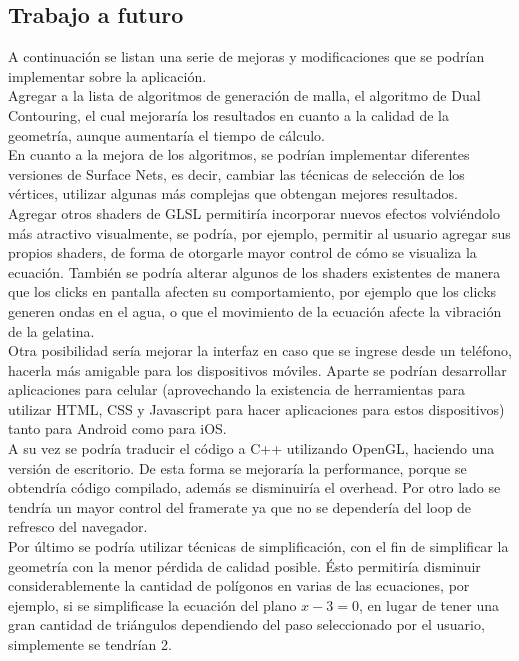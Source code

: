 \documentclass[12pt]{article}
\begin{document}
\subsection{Trabajo a futuro}
A continuación se listan una serie de mejoras y modificaciones que se podrían implementar sobre la aplicación.
\\Agregar a la lista de algoritmos de generación de malla, el algoritmo de Dual Contouring\cite{dualcontour}, el cual mejoraría los resultados en cuanto a la calidad de la geometría, aunque aumentaría el tiempo de cálculo. 
\\En cuanto a la mejora de los algoritmos, se podrían implementar diferentes versiones de Surface Nets, es decir, cambiar las técnicas de selección de los vértices, utilizar algunas más complejas que obtengan mejores resultados.
\\Agregar otros shaders de GLSL permitiría incorporar nuevos efectos volviéndolo más atractivo visualmente, se podría, por ejemplo, permitir al usuario agregar sus propios shaders, de forma de otorgarle  mayor control de cómo se visualiza la ecuación. También se podría alterar algunos de los shaders existentes de manera que los clicks en pantalla afecten su comportamiento, por ejemplo que los clicks generen ondas en el agua, o que el movimiento de la ecuación afecte la vibración de la gelatina.
\\Otra posibilidad sería mejorar la interfaz en caso que se ingrese desde un teléfono, hacerla más amigable para los dispositivos móviles.
Aparte se podrían desarrollar aplicaciones para celular (aprovechando la existencia de herramientas para utilizar HTML, CSS y Javascript para hacer aplicaciones para estos dispositivos) tanto para Android como para iOS. 
\\A su vez se podría traducir el código a C++ utilizando OpenGL, haciendo una versión de escritorio. De esta forma se mejoraría la performance, porque se obtendría código compilado, además se disminuiría el overhead. Por otro lado se tendría un mayor control del framerate ya que no se dependería del loop de refresco del navegador.
\\Por último se podría utilizar técnicas de simplificación\cite{simplificacion}\cite{realtimerendering}, con el fin de simplificar la geometría con la menor pérdida de calidad posible. Ésto permitiría disminuir considerablemente la cantidad de polígonos en varias de las ecuaciones, por ejemplo, si se simplificase la ecuación del plano $x-3=0$, en lugar de tener una gran cantidad de triángulos dependiendo del paso seleccionado por el usuario, simplemente se tendrían 2.
\end{document}
